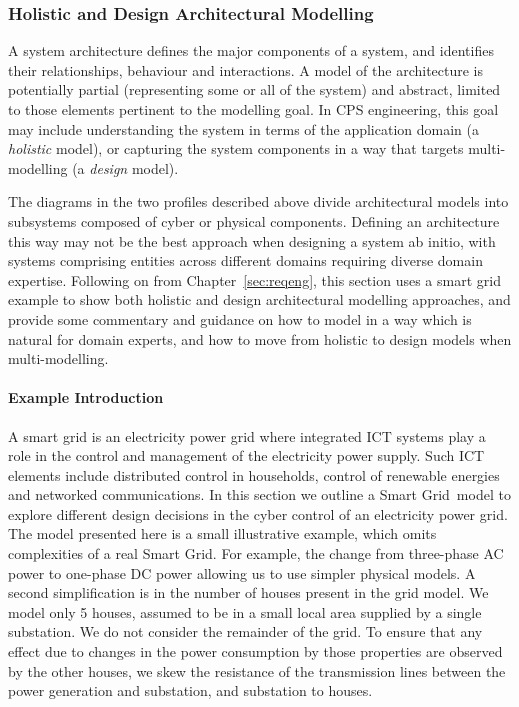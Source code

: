 \subsubsection{Holistic and Design Architectural Modelling}
\label{sec:sysml:holistic}

A system architecture defines the major components of a system, and identifies their relationships, behaviour and interactions. A model of the architecture is potentially partial (representing some or all of the system) and abstract, limited to those elements pertinent to the modelling goal. In CPS engineering, this goal may include understanding the system in terms of the application domain (a \emph{holistic} model), or capturing the system components in a way that targets multi-modelling (a \emph{design} model).

The diagrams in the two profiles described above divide architectural models into subsystems composed of cyber or physical components. Defining an architecture this way may not be the best approach when designing a system ab initio, with systems comprising entities across different domains requiring diverse domain expertise. Following on from Chapter~\ref{sec:reqeng}, this section uses a smart grid example to show both holistic and design architectural modelling approaches, and provide some commentary and guidance on how to model in a way which is natural for domain experts, and how to move from holistic to design models when multi-modelling.

\paragraph{Example Introduction}

A smart grid is an electricity power grid where integrated ICT systems play a role in the control and management of the electricity power supply. Such ICT elements include distributed control in households, control of renewable energies and networked communications.
In this section we outline a Smart Grid\ model to explore different design decisions in the cyber control of an electricity power grid. The model presented here is a small illustrative example, which omits complexities of a real Smart Grid. For example, the change from three-phase AC power to one-phase DC power allowing us to use simpler physical models. A second simplification is in the number of houses present in the grid model. We model only 5 houses, assumed to be in a small local area supplied by a single substation. We do not consider the remainder of the grid. To ensure that any effect due to changes in the power consumption by those properties are observed by the other houses, we skew the resistance of the transmission lines between the power generation and substation, and substation to houses.

